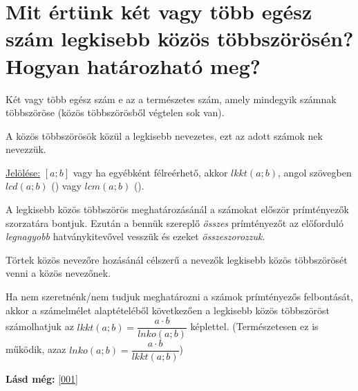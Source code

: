 
\section{Mit értünk két vagy több egész szám legkisebb közös többszörösén?
\texorpdfstring{\\}{}Hogyan határozható meg?}
\label{002}

\begin{defin}
Két vagy több egész szám e az a természetes szám,
amely mindegyik számnak többszöröse (közös többszörösből végtelen sok van).
\end{defin}

\begin{defin}
A közös többszörösök közül a legkisebb nevezetes, ezt az adott számok
nek nevezzük.

\uline{Jelölése:} $[a; b]$ vagy ha egyébként félreérhető, akkor $lkkt(a; b)$,
angol szövegben $lcd(a; b)$ () vagy $lcm(a;
b)$ ().
\end{defin}

\begin{method}
A legkisebb közös többszörös meghatározásánál a számokat először prímtényezők
szorzatára bontjuk. Ezután a bennük szereplő \emph{összes} prímtényezőt az
előforduló \emph{legnagyobb} hatványkitevővel vesszük és ezeket
\emph{összeszorozzuk}.
\end{method}

\begin{note2}
Törtek közös nevezőre hozásánál célszerű a nevezők legkisebb közös többszörösét
venni a közös nevezőnek.
\end{note2}

\begin{method2}
Ha nem szeretnénk/nem tudjuk meghatározni a számok prímtényezős felbontását,
akkor a számelmélet alaptételéből következően a legkisebb közös többszöröst
számolhatjuk az $lkkt(a; b) = \dfrac{a \cdot b}{lnko(a; b)}$ képlettel.
(Természetesen ez  is működik, azaz $lnko(a; b) = \dfrac{a
\cdot b}{lkkt(a; b)}$)
\end{method2}

\textbf{Lásd még:} \ref{001}
